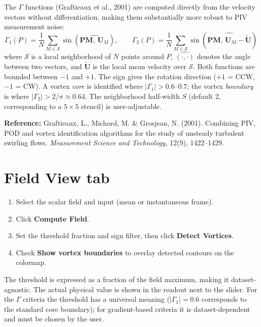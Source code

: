 \documentclass[11pt, a4paper]{report}
\newcommand{\uipth}[1]{\textbf{\textcolor{upblue}{#1}}}
\begin{document}
The $\Gamma$ functions (Graftieaux et al., 2001) are computed directly from the velocity vectors without differentiation, making them substantially more robust to PIV measurement noise:
\[
\Gamma_1(P) = \frac{1}{N} \sum_{M \in \mathcal{S}} \sin\!\left(\widehat{\mathbf{PM},\, \mathbf{U}_M}\right), \qquad
\Gamma_2(P) = \frac{1}{N} \sum_{M \in \mathcal{S}} \sin\!\left(\widehat{\mathbf{PM},\, \mathbf{U}_M - \widetilde{\mathbf{U}}}\right)
\]
where $\mathcal{S}$ is a local neighborhood of $N$ points around $P$, $\widehat{(\cdot,\cdot)}$ denotes the angle between two vectors, and $\widetilde{\mathbf{U}}$ is the local mean velocity over $\mathcal{S}$. Both functions are bounded between $-1$ and $+1$. The sign gives the rotation direction ($+1$ = CCW, $-1$ = CW). A vortex \emph{core} is identified where $|\Gamma_1| > 0.6$--$0.7$; the vortex \emph{boundary} is where $|\Gamma_2| > 2/\pi \approx 0.64$. The neighborhood half-width $S$ (default 2, corresponding to a $5 \times 5$ stencil) is user-adjustable.

\noindent\textbf{Reference:} Graftieaux, L., Michard, M. \& Grosjean, N. (2001). Combining PIV, POD and vortex identification algorithms for the study of unsteady turbulent swirling flows. \textit{Measurement Science and Technology}, 12(9), 1422--1429.

\section{Field View tab}

\begin{stepbox}
\begin{enumerate}[leftmargin=1.5em, topsep=2pt]
  \item Select the scalar field and input (mean or instantaneous frame).
  \item Click \uipth{Compute Field}.
  \item Set the threshold fraction and sign filter, then click \uipth{Detect Vortices}.
  \item Check \uipth{Show vortex boundaries} to overlay detected contours on the colormap.
\end{enumerate}
\end{stepbox}

The threshold is expressed as a fraction of the field maximum, making it dataset-agnostic. The actual physical value is shown in the readout next to the slider. For the $\Gamma$ criteria the threshold has a universal meaning ($|\Gamma_1| = 0.6$ corresponds to the standard core boundary); for gradient-based criteria it is dataset-dependent and must be chosen by the user.
\end{document}
